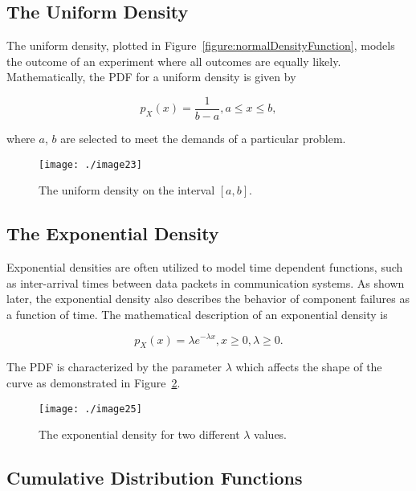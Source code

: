 {\subsection*{The Uniform Density}
\label{subsection:the-uniform-density}


The uniform density, plotted in 
Figure~\ref{figure:normalDensityFunction}, models the outcome of an
experiment where all outcomes are equally likely. Mathematically, the
PDF for a uniform density is given by

\begin{equation}
\label{equ:uniformDensity}
p_X(x) = \frac{1}{b-a}, a \leq x \leq b,
\end{equation}

where $a$, $b$ are selected to meet the demands of a particular problem.


\begin{figure}
\texttt{[image: ./image23]}
\caption{The uniform density on the interval $[ a,b ]$.}
\label{figure:uniformDensityFunction}
\end{figure}


\subsection*{The Exponential Density}
\label{subsection:the-exponential-density}


Exponential densities are often utilized to model time dependent
functions, such as inter-arrival times between data packets in
communication systems. As shown later, the exponential density also
describes the behavior of component failures as a function of time. The
mathematical description of an exponential density is

\begin{equation}
\label{equ:exponentialDensity}
p_X(x) = \lambda e^{-\lambda x} , x \geq 0, \lambda \geq 0.
\end{equation}

The PDF is characterized by the parameter $\lambda$ which affects the
shape of the curve as demonstrated in 
Figure~\ref{figure:exponentialDensityFunction}.


\begin{figure}
\texttt{[image: ./image25]}
\caption{The exponential density for two different $\lambda$ values.}
\label{figure:exponentialDensityFunction}
\end{figure}


\subsection{Cumulative Distribution Functions}
\label{cumulative-distribution-functions}

}
